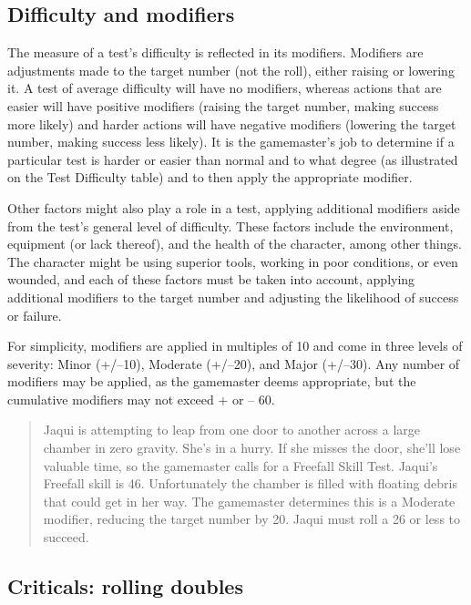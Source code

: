 \subsection{Difficulty and modifiers}
\label{sec:difficulty-modifiers}

The measure of a test's difficulty is reflected in its modifiers.
Modifiers are adjustments made to the target number (not the roll),
either raising or lowering it. A test of average difficulty will have
no modifiers, whereas actions that are easier will have positive
modifiers (raising the target number, making success more likely) and
harder actions will have negative modifiers (lowering the target
number, making success less likely). It is the gamemaster's job to
determine if a particular test is harder or easier than normal and to
what degree (as illustrated on the Test Difficulty table) and to then
apply the appropriate modifier.

Other factors might also play a role in a test, applying additional
modifiers aside from the test's general level of difficulty. These
factors include the environment, equipment (or lack thereof), and the
health of the character, among other things. The character might be
using superior tools, working in poor conditions, or even wounded, and
each of these factors must be taken into account, applying additional
modifiers to the target number and adjusting the likelihood of success
or failure.

For simplicity, modifiers are applied in multiples of 10 and come in
three levels of severity: Minor (+/–10), Moderate (+/–20), and Major
(+/–30). Any number of modifiers may be applied, as the gamemaster
deems appropriate, but the cumulative modifiers may not exceed + or –
60.

\begin{quotation}
  Jaqui is attempting to leap from one door to another across a large
  chamber in zero gravity. She's in a hurry. If she misses the door,
  she'll lose valuable time, so the gamemaster calls for a Freefall
  Skill Test. Jaqui's Freefall skill is 46. Unfortunately the chamber
  is filled with floating debris that could get in her way. The
  gamemaster determines this is a Moderate modifier, reducing the
  target number by 20. Jaqui must roll a 26 or less to succeed.
\end{quotation}

\subsection{Criticals: rolling doubles}
\label{sec:crit-roll-doubl}

